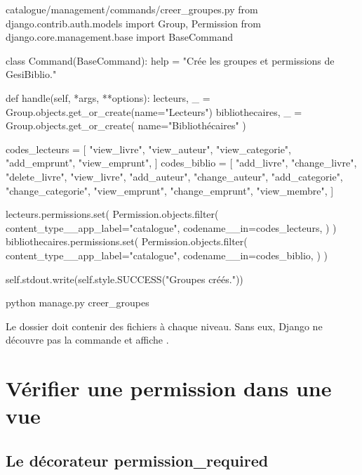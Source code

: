 \begin{codebox}[python]{catalogue/management/commands/creer\_groupes.py}
from django.contrib.auth.models import Group, Permission
from django.core.management.base import BaseCommand


class Command(BaseCommand):
    help = "Crée les groupes et permissions de GesiBiblio."

    def handle(self, *args, **options):
        lecteurs, _ = Group.objects.get_or_create(name="Lecteurs")
        bibliothecaires, _ = Group.objects.get_or_create(
            name="Bibliothécaires"
        )

        codes_lecteurs = [
            "view_livre",
            "view_auteur",
            "view_categorie",
            "add_emprunt",
            "view_emprunt",
        ]
        codes_biblio = [
            "add_livre",
            "change_livre",
            "delete_livre",
            "view_livre",
            "add_auteur",
            "change_auteur",
            "add_categorie",
            "change_categorie",
            "view_emprunt",
            "change_emprunt",
            "view_membre",
        ]

        lecteurs.permissions.set(
            Permission.objects.filter(
                content_type__app_label="catalogue",
                codename__in=codes_lecteurs,
            )
        )
        bibliothecaires.permissions.set(
            Permission.objects.filter(
                content_type__app_label="catalogue",
                codename__in=codes_biblio,
            )
        )

        self.stdout.write(self.style.SUCCESS("Groupes créés."))
\end{codebox}

\begin{terminal}
python manage.py creer_groupes
\end{terminal}

\begin{attention}
Le dossier  doit contenir des fichiers
 à chaque niveau. Sans eux, Django ne découvre pas la
commande et affiche .
\end{attention}

\section{Vérifier une permission dans une vue}

\subsection{Le décorateur permission\_required}

